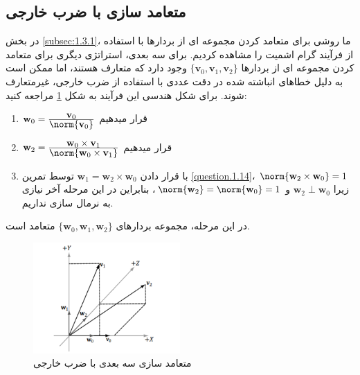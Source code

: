 \subsection{\textbf{متعامد سازی با ضرب خارجی}}
\label{subsec:1.4.2}
{
    \Large
    \begin{spacing}{1.5}
        در بخش \ref{subsec:1.3.1}، ما روشی برای متعامد کردن مجموعه ای از بردارها با استفاده از فرآیند گرام اشمیت را مشاهده کردیم.
        برای سه بعدی، استراتژی دیگری برای متعامد کردن مجموعه ای از بردارها $\{\textbf{v}_{0},\textbf{v}_{1},\textbf{v}_{2}\}$ وجود دارد که متعارف هستند،
        اما ممکن است به دلیل خطاهای انباشته شده در دقت عددی با استفاده از ضرب خارجی، غیرمتعارف شوند.
        برای شکل هندسی این فرآیند به شکل \ref{fig:4.Session.1.1.15} مراجعه کنید:

        \begin{enumerate}[label=\textbf{\arabic*}.]
            \item {$\textbf{w}_{0}=\frac{\displaystyle\textbf{v}_{0}}{\displaystyle\norm{\textbf{v}_{0}}}$ قرار میدهیم}
            \item {$\textbf{w}_{2}=\frac{\displaystyle\textbf{w}_{0}\times\textbf{v}_{1}}{\displaystyle\norm{\textbf{w}_{0}\times\textbf{v}_{1}}}$ قرار میدهیم}
            \item {با قرار دادن $\textbf{w}_{1}=\textbf{w}_{2}\times\textbf{w}_{0}$ توسط تمرین \ref{question.1.14}، $\norm{\textbf{w}_{2}\times\textbf{w}_{0}}=1$ زیرا $\textbf{w}_{2}\perp\textbf{w}_{0}$ و $\norm{\textbf{w}_{2}}=\norm{\textbf{w}_{0}}=1$،
            بنابراین در این مرحله آخر نیازی به نرمال سازی نداریم.}
        \end{enumerate}

        در این مرحله، مجموعه بردارهای $\{\textbf{w}_{0},\textbf{w}_{1},\textbf{w}_{2}\}$ متعامد است.

        \begin{figure}[H]
            \centering
            \setlength{\belowcaptionskip}{-10pt}
            \includegraphics[width=0.5\textwidth]{Images/4/1/4.Session.1.1.15}
            \caption {متعامد سازی سه بعدی با ضرب خارجی}
            \label{fig:4.Session.1.1.15}
        \end{figure}


\end{spacing}}
